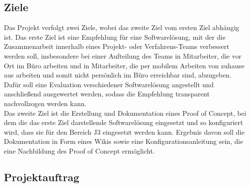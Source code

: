 \documentclass[ThesisDJ.tex]{subfiles}
\begin{document}
	\subsection{Ziele}
	Das Projekt verfolgt zwei Ziele, wobei das zweite Ziel vom ersten Ziel abhängig ist.
	Das erste Ziel ist eine Empfehlung für eine Softwarelösung, mit der die Zusammenarbeit innerhalb eines Projekt- oder Verfahrens-Teams verbessert werden soll, insbesondere bei einer Aufteilung des Teams in Mitarbeiter, die vor Ort im Büro arbeiten und in Mitarbeiter, die per mobilem Arbeiten von zuhause aus arbeiten und somit nicht persönlich im Büro erreichbar sind, abzugeben.\\
	Dafür soll eine Evaluation verschiedener Softwarelösung angestellt und anschließend ausgewertet werden, sodass die Empfehlung transparent nachvollzogen werden kann.\\
	Das zweite Ziel ist die Erstellung und Dokumentation eines Proof of Concept, bei dem die das erste Ziel darstellende Softwarelösung eingesetzt und so konfiguriert wird, dass sie für den Bereich J3 eingesetzt werden kann. Ergebnis davon soll die Dokumentation in Form eines Wikis sowie eine Konfigurationsanleitung sein, die eine Nachbildung des Proof of Concept ermöglicht.
	
	
	\subsection{Projektauftrag}
	
\end{document}
